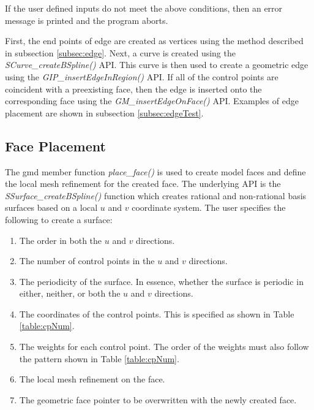 \documentclass[a4paper, 12pt]{article}
\begin{document}
If the user defined inputs do not meet the above conditions, then an error 
message is printed and the program aborts.

First, the end points of edge are created as vertices using the 
method described in subsection \ref{subsec:edge}. Next, a curve
is created using the \emph{SCurve\_createBSpline()} API. This 
curve is then used to create a geometric edge using the 
\emph{GIP\_insertEdgeInRegion()} API. If all of the 
control points are coincident with a preexisting face, then the
edge is inserted onto the corresponding face using the 
\emph{GM\_insertEdgeOnFace()} API. Examples of edge placement
are shown in subsection \ref{subsec:edgeTest}.

\subsection{Face Placement} \label{subsec:face}
The gmd member function \emph{place\_face()} is used to create model 
faces and define the local mesh refinement for the created face. The
underlying API is the \emph{SSurface\_createBSpline()} function which
creates rational and non-rational basis surfaces 
based on a local $u$ and $v$ 
coordinate system.  The user specifies the following to create a surface:
\begin{enumerate}
  \item The order in both the $u$ and $v$ directions.
  \item The number of control points in the $u$ and $v$ directions.
  \item The periodicity of the surface. In essence, whether the 
      surface is periodic in either, neither, 
      or both the $u$ and $v$ directions.
  \item The coordinates of the control points. This is specified as shown in
      Table \ref{table:cpNum}.
  \item The weights for each control point. The order of the weights must
      also follow the pattern shown in Table \ref{table:cpNum}.
  \item The local mesh refinement on the face. 
  \item The geometric face pointer to be overwritten
       with the newly created face.
\end{enumerate}
\end{document}
